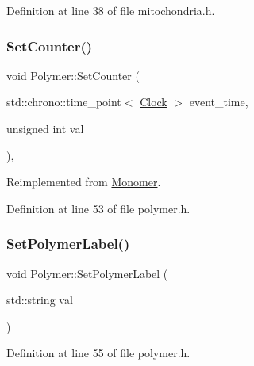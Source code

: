 Definition at line 38 of file mitochondria.\+h.

\mbox{\label{class_polymer_a1500ffc682396af2f4306c7c7ea7fd87}} 
\subsubsection{\texorpdfstring{Set\+Counter()}{SetCounter()}}
{\footnotesize\ttfamily void Polymer\+::\+Set\+Counter (\begin{DoxyParamCaption}\item[{std\+::chrono\+::time\+\_\+point$<$ \hyperlink{universe_8h_a0ef8d951d1ca5ab3cfaf7ab4c7a6fd80}{Clock} $>$}]{event\+\_\+time,  }\item[{unsigned int}]{val }\end{DoxyParamCaption})\hspace{0.3cm}{\ttfamily [inline]}, {\ttfamily [virtual]}}



Reimplemented from \hyperlink{class_monomer_a6f0dfa4382b3d4fa19b7ee0fb8fe7a55}{Monomer}.



Definition at line 53 of file polymer.\+h.

\mbox{\label{class_polymer_ab96200f701d9e2e63d22bdfd434e5ccb}} 
\subsubsection{\texorpdfstring{Set\+Polymer\+Label()}{SetPolymerLabel()}}
{\footnotesize\ttfamily void Polymer\+::\+Set\+Polymer\+Label (\begin{DoxyParamCaption}\item[{std\+::string}]{val }\end{DoxyParamCaption})\hspace{0.3cm}{\ttfamily [inline]}}



Definition at line 55 of file polymer.\+h.

\mbox{\label{class_polymer_ac82f603c3010212122008c4ed3953045}} 
